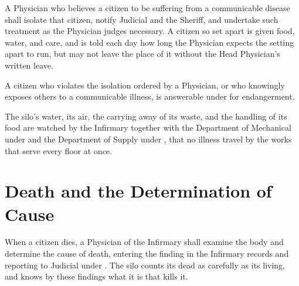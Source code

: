 \begin{clauses}
\item A Physician who believes a citizen to be suffering from a communicable disease shall isolate that citizen, notify Judicial and the Sheriff, and undertake such treatment as the Physician judges necessary. A citizen so set apart is given food, water, and care, and is told each day how long the Physician expects the setting apart to run, but may not leave the place of it without the Head Physician's written leave.
\item A citizen who violates the isolation ordered by a Physician, or who knowingly exposes others to a communicable illness, is answerable under  for endangerment.
\item The silo's water, its air, the carrying away of its waste, and the handling of its food are watched by the Infirmary together with the Department of Mechanical under  and the Department of Supply under , that no illness travel by the works that serve every floor at once.
\end{clauses}

\section{Death and the Determination of Cause}
\label{sec:health:death-and-the-determination-of-cause}

When a citizen dies, a Physician of the Infirmary shall examine the body and determine the cause of death, entering the finding in the Infirmary records and reporting to Judicial under . The silo counts its dead as carefully as its living, and knows by these findings what it is that kills it.

